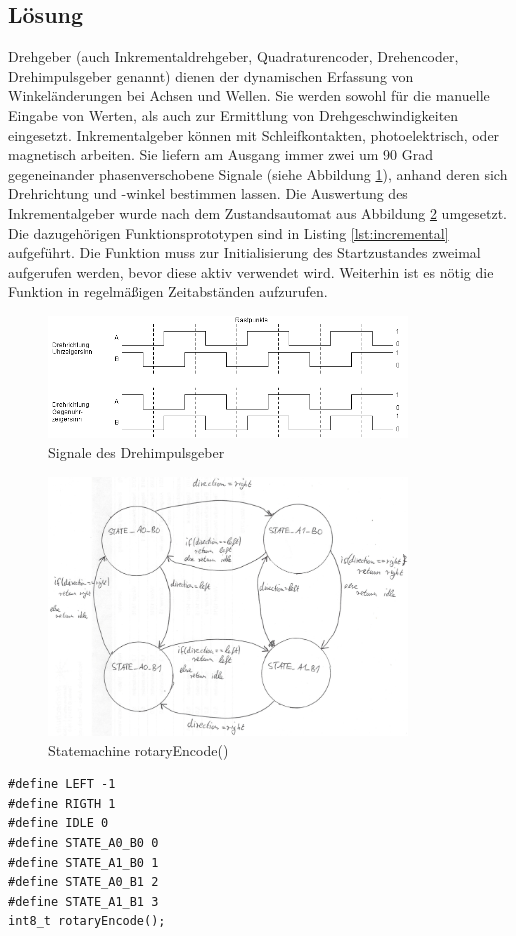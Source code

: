 \subsection{Lösung}
Drehgeber (auch Inkrementaldrehgeber, Quadraturencoder, Drehencoder, Drehimpulsgeber genannt) dienen der dynamischen Erfassung von Winkeländerungen bei Achsen und Wellen. Sie werden sowohl für die manuelle Eingabe von Werten, als auch zur Ermittlung von Drehgeschwindigkeiten eingesetzt.\newline
Inkrementalgeber können mit Schleifkontakten, photoelektrisch, oder magnetisch arbeiten. Sie liefern am Ausgang immer zwei um 90 Grad gegeneinander phasenverschobene Signale (siehe Abbildung \ref{image:Encoder_signal}), anhand deren sich Drehrichtung und -winkel bestimmen lassen. \newline
Die Auswertung des Inkrementalgeber wurde nach dem Zustandsautomat aus Abbildung \ref{image:RotatoryEnode_StateMachine} umgesetzt. Die dazugehörigen Funktionsprototypen sind in Listing \ref{lst:incremental} aufgeführt. \newline
Die Funktion muss zur Initialisierung des Startzustandes zweimal aufgerufen werden, bevor diese aktiv verwendet wird. Weiterhin ist es nötig die Funktion in regelmäßigen Zeitabständen aufzurufen. \newline
\newpage
\begin{figure}[!h]
	\centering
	\includegraphics[width=0.85\textwidth]{Images/Encoder_signal}
	\caption[NonBlockingCode]{Signale des Drehimpulsgeber}
	\label{image:Encoder_signal}
\end{figure}

\begin{figure}[!h]
	\centering
	\includegraphics[width=0.85\textwidth]{Images/RotatoryEnode_StateMachine}
	\caption[NonBlockingCode]{Statemachine rotaryEncode()}
	\label{image:RotatoryEnode_StateMachine}
\end{figure}


\begin{lstlisting}[frame=htrbl, caption={Funktionsprototypen für Inkrementalgeber}, label={lst:incremental}]
#define LEFT -1
#define RIGTH 1
#define IDLE 0
#define STATE_A0_B0 0
#define STATE_A1_B0 1
#define STATE_A0_B1 2
#define STATE_A1_B1 3
int8_t rotaryEncode();
\end{lstlisting}

